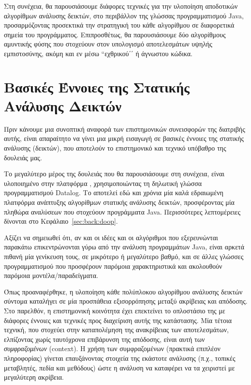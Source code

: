 Στη συνέχεια, θα παρουσιάσουμε διάφορες τεχνικές για την υλοποίηση αποδοτικών αλγορίθμων ανάλυσης δεικτών, στο περιβάλλον της γλώσσας προγραμματισμού {\en Java}, προσαρμόζοντας προσεκτικά την στρατηγική του κάθε αλγορίθμου σε διαφορετικά σημεία του προγράμματος. Επιπροσθέτως, θα παρουσιάσουμε δύο αλγορίθμους αμυντικής φύσης που στοχεύουν στον \mbox{υπολογισμό} αποτελεσμάτων υψηλής εμπιστοσύνης, ακόμη και εν μέσω ``εχθρικού΄΄ ή άγνωστου κώδικα.


\section*{Βασικές Έννοιες της Στατικής Ανάλυσης Δεικτών}

Πριν κάνουμε μια συνοπτική αναφορά των επιστημονικών συνεισφορών της διατριβής αυτής, είναι απαραίτητο να γίνει μια μικρή εισαγωγή σε βασικές έννοιες της στατικής ανάλυσης (δεικτών), που αποτελούν το επιστημονικό και τεχνικό υπόβαθρο της δουλειάς μας.

Το μεγαλύτερο μέρος της δουλειάς που θα παρουσιάσουμε στη συνέχεια, είναι υλοποιημένο στην πλατφόρμα {\en \doop{}}\cite{oopsla:2009:Bravenboer}, χρησιμοποιώντας τη δηλωτική γλώσσα προγραμματισμού {\en Datalog}. Το {\en \doop{}} αποτελεί εδώ και χρόνια μία καλά εδραιωμένη πλατφόρμα ανάπτυξης αλγορίθμων στατικής ανάλυσης δεικτών, προσφέροντας μία πληθώρα αναλύσεων που στοχεύουν προγράμματα {\en Java}. Περισσότερες \mbox{λεπτομέρειες} δίνονται στο Κεφάλαιο~\ref{sec:back:doop}.

Αξίζει να σημειωθεί ότι, αν και οι ιδέες και οι αλγόριθμοι που εξερευνώνται παρακάτω επικεντρώνονται γύρω από την ανάλυση προγραμμάτων {\en Java}, είναι αρκετά πιθανή μία γενίκευση τους, σε μικρότερο ή μεγαλύτερο βαθμό, και σε άλλες γλώσσες προγραμματισμού που προσφέρουν παρόμοια χαρακτηριστικά και ακολουθούν παρόμοια μοντέλα/παραδείγματα.


Όπως προαναφέρθηκε, η υλοποίηση κάθε πολύπλοκου αλγορίθμου ανάλυσης δεικτών σύντομα καταλήγει σε μία προσπάθεια εξισορρόπησης μεταξύ ακρίβειας και απόδοσης. Στο παρελθόν, η επιστημονική κοινότητα έχει επεκτείνει το οπλοστάσιο της με διάφορες έννοιες και τεχνικές προς διαχείριση αυτής της κατάστασης. Μία τέτοια τεχνική, που στοχεύει στην καταπολέμηση της ανακρίβειας των αποτελεσμάτων, ελπίζοντας χωρίς ταυτόχρονα επιβάρυνση της απόδοσης, είναι αυτή των \emph{συμφραζομένων} ({\en context}). Η χρήση των συμφραζομένων (πρακτικά επιπλέον πληροφορίας) γίνεται επαυξάνοντας στοιχεία της εκάστοτε ανάλυσης (π.χ., τοπικές μεταβλητές, πεδία και μεθόδους) ώστε η ανάλυση να καταφέρει να τα χειριστεί με μεγαλύτερη ακρίβεια.

